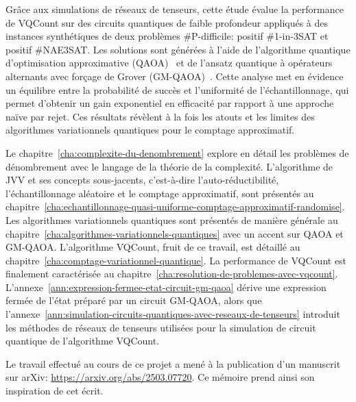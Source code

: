 Grâce aux simulations de réseaux de tenseurs, cette étude évalue la performance de VQCount sur des circuits quantiques de faible profondeur appliqués à des instances synthétiques de deux problèmes \textsf{\#P}-difficile: positif \#1-in-3SAT et positif \#NAE3SAT. Les solutions sont générées à l'aide de l'algorithme quantique d'optimisation approximative (QAOA)~\cite{farhiQuantumApproximateOptimization2014} et de l'ansatz quantique à opérateurs alternants avec forçage de Grover (GM-QAOA)~\cite{bartschiGroverMixersQAOA2020}. Cette analyse met en évidence un équilibre entre la probabilité de succès et l'uniformité de l'échantillonnage, qui permet d'obtenir un gain exponentiel en efficacité par rapport à une approche naïve par rejet. Ces résultats révèlent à la fois les atouts et les limites des algorithmes variationnels quantiques pour le comptage approximatif.

Le chapitre~\ref{cha:complexite-du-denombrement} explore en détail les problèmes de dénombrement avec le langage de la théorie de la complexité. L'algorithme de JVV et ses concepts sous-jacents, c'est-à-dire l'auto-réductibilité, l'échantillonnage aléatoire et le comptage approximatif, sont présentés au chapitre~\ref{cha:echantillonnage-quasi-uniforme-comptage-approximatif-randomise}. Les algorithmes variationnels quantiques sont présentés de manière générale au chapitre~\ref{cha:algorithmes-variationnels-quantiques} avec un accent sur QAOA et GM-QAOA. L'algorithme VQCount, fruit de ce travail, est détaillé au chapitre~\ref{cha:comptage-variationnel-quantique}. La performance de VQCount est finalement caractérisée au chapitre~\ref{cha:resolution-de-problemes-avec-vqcount}. L'annexe~\ref{ann:expression-fermee-etat-circuit-gm-qaoa} dérive une expression fermée de l'état préparé par un circuit GM-QAOA, alors que l'annexe~\ref{ann:simulation-circuits-quantiques-avec-reseaux-de-tenseurs} introduit les méthodes de réseaux de tenseurs utilisées pour la simulation de circuit quantique de l'algorithme VQCount.

Le travail effectué au cours de ce projet a mené à la publication d'un manuscrit sur arXiv: \url{https://arxiv.org/abs/2503.07720}. Ce mémoire prend ainsi son inspiration de cet écrit.